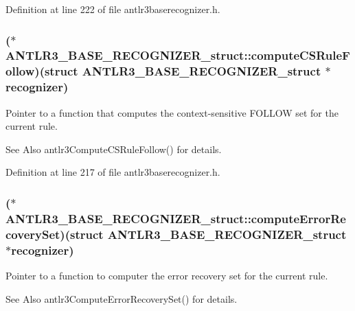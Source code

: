 Definition at line 222 of file antlr3baserecognizer.\-h.

\hypertarget{struct_a_n_t_l_r3___b_a_s_e___r_e_c_o_g_n_i_z_e_r__struct_a795ea57e517a9fdcd05d070a7b59bf47}{
\subsubsection[{compute\-C\-S\-Rule\-Follow}]{($\ast$ A\-N\-T\-L\-R3\-\_\-\-B\-A\-S\-E\-\_\-\-R\-E\-C\-O\-G\-N\-I\-Z\-E\-R\-\_\-struct\-::compute\-C\-S\-Rule\-Follow)(struct {\bf A\-N\-T\-L\-R3\-\_\-\-B\-A\-S\-E\-\_\-\-R\-E\-C\-O\-G\-N\-I\-Z\-E\-R\-\_\-struct} $\ast${\bf recognizer})}}\label{struct_a_n_t_l_r3___b_a_s_e___r_e_c_o_g_n_i_z_e_r__struct_a795ea57e517a9fdcd05d070a7b59bf47}
Pointer to a function that computes the context-\/sensitive F\-O\-L\-L\-O\-W set for the current rule. \begin{DoxySeeAlso}{See Also}
antlr3\-Compute\-C\-S\-Rule\-Follow() for details. 
\end{DoxySeeAlso}


Definition at line 217 of file antlr3baserecognizer.\-h.

\hypertarget{struct_a_n_t_l_r3___b_a_s_e___r_e_c_o_g_n_i_z_e_r__struct_a91345696da39e74211e056303572197a}{
\subsubsection[{compute\-Error\-Recovery\-Set}]{($\ast$ A\-N\-T\-L\-R3\-\_\-\-B\-A\-S\-E\-\_\-\-R\-E\-C\-O\-G\-N\-I\-Z\-E\-R\-\_\-struct\-::compute\-Error\-Recovery\-Set)(struct {\bf A\-N\-T\-L\-R3\-\_\-\-B\-A\-S\-E\-\_\-\-R\-E\-C\-O\-G\-N\-I\-Z\-E\-R\-\_\-struct} $\ast${\bf recognizer})}}\label{struct_a_n_t_l_r3___b_a_s_e___r_e_c_o_g_n_i_z_e_r__struct_a91345696da39e74211e056303572197a}
Pointer to a function to computer the error recovery set for the current rule. \begin{DoxySeeAlso}{See Also}
antlr3\-Compute\-Error\-Recovery\-Set() for details. 
\end{DoxySeeAlso}


